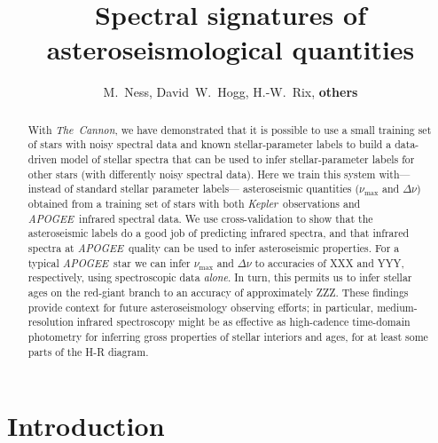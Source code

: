 \documentclass[12pt, preprint]{aastex}
\newcommand{\project}[1]{\textsl{#1}}
\newcommand{\thecannon}{\project{The~Cannon}}
\newcommand{\apogee}{\project{APOGEE}}
\newcommand{\kepler}{\project{Kepler}}
\newcommand{\numax}{\nu_{\max}}
\newcommand{\deltanu}{\Delta\nu}
\begin{document}
\title{Spectral signatures of asteroseismological quantities}
\author{M.~Ness,
David~W.~Hogg,
H.-W.~Rix,
\textbf{others}}

\begin{abstract}%
With \thecannon, we have demonstrated that it is possible to use a small
training set of stars with noisy spectral data and known stellar-parameter labels
to build a data-driven model of stellar spectra that can be used to infer
stellar-parameter labels for other stars (with differently noisy spectral data).
Here we train this system with---instead of standard stellar parameter labels---%
asteroseismic quantities ($\numax$ and $\deltanu$) obtained from a training set of
stars with both \kepler\ observations and \apogee\ infrared spectral data.
We use cross-validation to show that
the asteroseismic labels do a good job of predicting infrared spectra,
and that infrared spectra at \apogee\ quality can be used to infer asteroseismic
properties.
For a typical \apogee\ star we can infer $\numax$ and $\deltanu$ to accuracies of
XXX and YYY, respectively, using spectroscopic data \emph{alone}.
In turn, this permits us to infer stellar ages on the red-giant branch to an
accuracy of approximately ZZZ.
These findings provide context for future asteroseismology observing efforts;
in particular, medium-resolution infrared spectroscopy might be as
effective as high-cadence time-domain photometry for inferring gross properties
of stellar interiors and ages, for at least some parts of the H-R diagram.
\end{abstract}


\section{Introduction}\label{sec:Intro}
\end{document}

